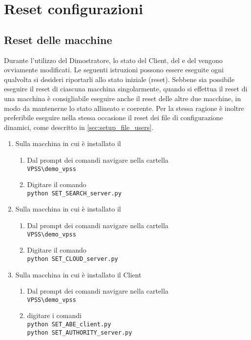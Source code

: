 \documentclass[a4paper,twoside,10pt,openany]{scrbook}
\begin{document}
\section{Reset configurazioni}\label{sec:reset_configurazioni}
\subsection{Reset delle macchine}\label{sec:setup_macchine}
\indent
Durante l'utilizzo del Dimostratore, lo stato del Client, del \sr e del \sa vengono ovviamente modificati.
Le seguenti istruzioni possono essere eseguite ogni qualvolta si desideri riportarli allo stato iniziale (reset). Sebbene sia possibile eseguire il reset di ciascuna macchina singolarmente, quando si effettua il reset di una macchina è consigliabile eseguire anche il reset delle altre due macchine, in modo da mantenerne lo stato allineato e coerente. Per la stessa ragione è inoltre preferibile eseguire nella stessa occasione il reset dei file di configurazione dinamici, come descritto in \ref{sec:setup_file_users}.
\begin{enumerate}
 \item Sulla macchina in cui è installato il \sr
 \begin{enumerate}
  \item Dal prompt dei comandi navigare nella cartella\\
        \texttt{VPSS\textbackslash demo\_vpss}
  \item Digitare il comando\\
        \texttt{python SET\_SEARCH\_server.py}
 \end{enumerate}
 \item Sulla macchina in cui è installato il \sa
 \begin{enumerate}
  \item Dal prompt dei comandi navigare nella cartella\\
        \texttt{VPSS\textbackslash demo\_vpss}
  \item Digitare il comando\\
        \texttt{python SET\_CLOUD\_server.py}
 \end{enumerate}
 \item Sulla macchina in cui è installato il Client
 \begin{enumerate}
 \item Dal prompt dei comandi navigare nella cartella \\
       \texttt{VPSS\textbackslash demo\_vpss}
 \item digitare i comandi\\
       \texttt{python SET\_ABE\_client.py}\\
       \texttt{python SET\_AUTHORITY\_server.py}
\end{enumerate}
\end{enumerate}
%
\end{document}
